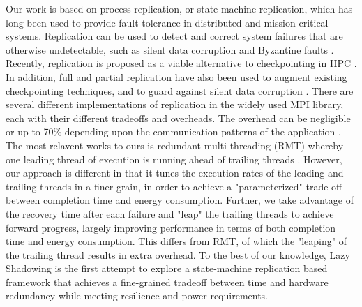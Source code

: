 Our work is based on process replication, or state machine replication, which has long been used to provide fault tolerance in distributed and mission critical systems\cite{schneider_1990_tutorial,bartlett_1981_nonstop}. Replication can be used to detect and correct system failures that are otherwise undetectable,
such as silent data corruption \cite{ni_2013_acr} and Byzantine faults \cite{fiala_2012_sdc}. Recently, replication is proposed as a
viable alternative to checkpointing in HPC \cite{riesen_sandia_2010,lefray_2013_rsd,Cappello:09:Fault}. 
In addition, full and partial
replication have also been used to augment existing checkpointing techniques, and to guard
against silent data corruption \cite{stearly_2012_partial,elliott_2012_cpr}. There are several different implementations of
replication in the widely used MPI library, each with their different tradeoffs and overheads. The
overhead can be negligible or up to 70\% depending upon the communication patterns of the
application \cite{engelmann2011redundant}. %
The most relavent works to ours is redundant multi-threading (RMT) whereby one leading thread of execution is running ahead of trailing threads \cite{reinhardt2000transient,Wadden:2014:RDE:2665671.2665686}. However, our approach is different in that it tunes the execution rates of the leading and trailing threads in a finer grain, in order to achieve a "parameterized" trade-off between completion time and energy consumption. Further, we take advantage of the recovery time after each failure and "leap" the trailing threads to achieve forward progress, largely improving performance in terms of both completion time and energy consumption. This differs from RMT, of which the "leaping" of the trailing thread results in extra overhead.
To the best of our knowledge,
Lazy Shadowing is the first attempt to explore a state-machine replication based framework
that achieves a fine-grained tradeoff between time and hardware redundancy while meeting resilience and
power requirements.